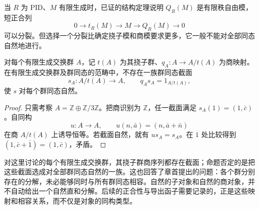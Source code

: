 当 \(R\) 为 PID、\(M\) 有限生成时，已证的结构定理说明 \(Q_R(M)\) 是有限秩自由模，短正合列
\[
	0\longrightarrow t_R(M)\longrightarrow M \longrightarrow Q_R(M)\longrightarrow0
\]
可以分裂。但选择一个分裂比确定挠子模和商模要求更多，它一般不能对全部同态自然地进行。

\begin{proposition}\label{b4:prop:no-natural-torsion-section}
	对每个有限生成交换群 \(A\)，记 \(t(A)\) 为其挠子群、\(q_A:A\rightarrow A/t(A)\) 为商映射。在有限生成交换群及群同态的范畴中，不存在一族群同态截面
	\[
		s_A:A/t(A)\longrightarrow A,\qquad q_As_A=1_{A/t(A)},
	\]
	使 \(s\) 对每个群同态自然。
\end{proposition}
\begin{proof}
	只需考察 \(A=\mathbb Z\oplus\mathbb Z/3\mathbb Z\)。把商识别为 \(\mathbb Z\)，任一截面满足 \(s_A(1)=(1,\bar c)\)。自同构
	\[
		u:A\longrightarrow A,\qquad u(n,\bar a)=(n,\bar a+\bar n)
	\]
	在商 \(A/t(A)\) 上诱导恒等。若截面自然，就有 \(us_A=s_A\)。在 \(1\) 处比较得到 \((1,\bar c+\bar1)=(1,\bar c)\)，矛盾。
\end{proof}

对这里讨论的每个有限生成交换群，其挠子群商序列都存在截面；命题否定的是把这些截面选成对全部群同态自然的一族。这也回答了章首提出的问题：各个群分别存在的分解，未必能够同时与所有群同态相容。自然的子对象和自然的商对象，并不自动给出一个自然直和分解。后续的正合性与导出函子需要记录的，正是这些映射和相容关系，而不仅是对象的同构类型。
